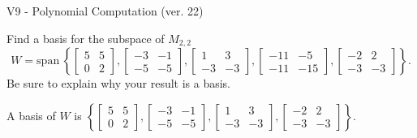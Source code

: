 \begin{exercise}
  \begin{exerciseTitle}V9 - Polynomial Computation (ver. 22)\end{exerciseTitle}
  \begin{exerciseStatement}
    Find a basis for the subspace of \(M_{2,2}\) 
\[W=\mathrm{span}\ \left\{\left[\begin{array}{cc}
5 & 5 \\
0 & 2
\end{array}\right] , \left[\begin{array}{cc}
-3 & -1 \\
-5 & -5
\end{array}\right] , \left[\begin{array}{cc}
1 & 3 \\
-3 & -3
\end{array}\right] , \left[\begin{array}{cc}
-11 & -5 \\
-11 & -15
\end{array}\right] , \left[\begin{array}{cc}
-2 & 2 \\
-3 & -3
\end{array}\right]\right\}.\]
 Be sure to explain why your result is a basis.


  \end{exerciseStatement}
  \begin{exerciseAnswer}
   A basis of \(W\) is  \(\left\{\left[\begin{array}{cc}
5 & 5 \\
0 & 2
\end{array}\right] , \left[\begin{array}{cc}
-3 & -1 \\
-5 & -5
\end{array}\right] , \left[\begin{array}{cc}
1 & 3 \\
-3 & -3
\end{array}\right] , \left[\begin{array}{cc}
-2 & 2 \\
-3 & -3
\end{array}\right]\right\}\).
  


  \end{exerciseAnswer}
\end{exercise}